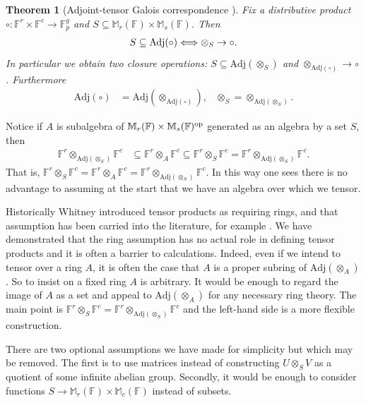 \documentclass{toc}
\numberwithin{equation}{section}
\theoremstyle{plain}       %
\newtheorem{thm}[equation]{Theorem}
\theoremstyle{remark}
\theoremstyle{definition}
\numberwithin{figure}{section}
\numberwithin{table}{section}
\renewcommand{\subset}{\subseteq}
\newcommand{\bbF}{\mathbb{F}}  %
\begin{document}
\begin{thm}[Adjoint-tensor Galois correspondence
{\cite[Theorem~2.11]{BW:autotopism}}] 
\label{thm:Galois}
	Fix a distributive product $\circ:\bbF^r\times\bbF^c\to \bbF_p^g$ and
	$S\subseteq \mathbb{M}_r(\bbF)\times \mathbb{M}_s(\bbF)$.  Then
	\begin{align*}
		 S\subseteq {\rm Adj}(\circ) \Longleftrightarrow 
		 \otimes_S \to \circ.
	\end{align*}
	In particular we obtain two closure operations: $S\subset
	\mathrm{Adj}(\otimes_S)$ and $\otimes_{\mathrm{Adj}(\circ)}\to \circ$.
	Furthermore
	\begin{align*}
		\mathrm{Adj}(\circ) & =\mathrm{Adj}(\otimes_{\mathrm{Adj}(\circ)}), &
		\otimes_S = \otimes_{\mathrm{Adj}(\otimes_S)}.
	\end{align*}
\end{thm}

Notice if $A$ is subalgebra of $\mathbb{M}_r(\bbF)\times \mathbb{M}_s(\bbF)^{\rm
op}$ generated as an algebra by a set $S$, then 
\begin{align*}
	\bbF^r\otimes_{\mathrm{Adj}(\otimes_S)}\bbF^c & 
	\subseteq \bbF^r\otimes_A\bbF^c  \subseteq 
	\bbF^r\otimes_S\bbF^c 
	= \bbF^r\otimes_{\mathrm{Adj}(\otimes_S)}\bbF^c.
\end{align*}
That is, $\bbF^r\otimes_S\bbF^c=\bbF^r\otimes_A\bbF^c
=\bbF^r\otimes_{\mathrm{Adj}(\otimes_S)}\bbF^c$.
In this way one sees there is no advantage to assuming at the start that we have
an algebra over which we tensor.

\begin{remark}\label{rem:no-ring}
  Historically Whitney introduced tensor products as requiring rings, and that
 assumption has been carried into the literature, for example
 \cite[Section~IV.5]{Hungerford}. We have demonstrated that the ring assumption
 has no actual role in defining tensor products and it is often a barrier to
 calculations.  Indeed, even if we intend to tensor over a ring $A$, it is
 often
 the case that $A$ is a proper subring of $\mathrm{Adj}(\otimes_A)$.  So to
 insist on a fixed ring $A$ is arbitrary. It would be enough to regard the
 image
 of $A$ as a set and appeal to $\mathrm{Adj}(\otimes_A)$ for any necessary
 ring  theory.  The main point is $\bbF^r\otimes_S\bbF^c =
 \bbF^r\otimes_{\mathrm{Adj}(\otimes_S)}\bbF^c$ and the left-hand side
 is a more flexible construction.

There are two optional assumptions we have made for simplicity but which may
be removed. The first is to use matrices instead of constructing 
$U\otimes_S V$ as a quotient of some infinite abelian group.  
Secondly, it would be
enough to consider functions 
$S\to \mathbb{M}_r(\bbF)\times \mathbb{M}_c(\bbF)$ instead of subsets.
\end{remark}
\end{document}
